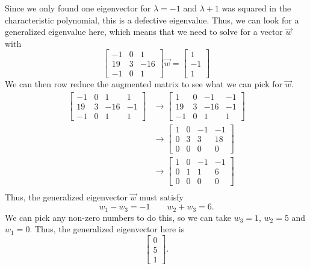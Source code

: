 \documentclass{ximera}
\begin{document}
\begin{exampleSol}
    Since we only found one eigenvector for $\lambda = -1$ and $\lambda + 1$ was squared in the characteristic polynomial, this is a defective eigenvalue. Thus, we can look for a generalized eigenvalue here, which means that we need to solve for a vector $\vec{w}$ with
    \[ 
        \begin{bmatrix} 
            -1 & 0 & 1 \\ 
            19 & 3 & -16 \\ 
            -1 & 0 & 1 
        \end{bmatrix} 
        \vec{w} = 
        \begin{bmatrix} 
            1 \\ 
            -1 \\ 
            1 
        \end{bmatrix}
    \]
    We can then row reduce the augmented matrix to see what we can pick for $\vec{w}$. 
    \[
        \begin{split}
            \begin{bmatrix} 
                -1 & 0 & 1 & 1 \\ 
                19 & 3 & -16 & -1\\ 
                -1 & 0 & 1 & 1 
            \end{bmatrix} 
            &\rightarrow 
            \begin{bmatrix} 
                1 & 0 & -1 & -1 \\ 
                19 & 3 & -16 & -1\\ 
                -1 & 0 & 1 & 1 
            \end{bmatrix} \\
            &\rightarrow 
            \begin{bmatrix} 
                1 & 0 & -1 & -1 \\ 
                0 & 3 & 3 & 18\\ 
                0 & 0 & 0 & 0 
            \end{bmatrix} \\
            &\rightarrow 
            \begin{bmatrix} 
                1 & 0 & -1 & -1 \\ 
                0 & 1 & 1 & 6\\ 
                0 & 0 & 0 & 0 
            \end{bmatrix} \\
        \end{split}
    \]
    Thus, the generalized eigenvector $\vec{w}$ must satisfy
    \[ 
        w_1 - w_3 = -1 \qquad w_2 + w_3 = 6. 
    \] 
    We can pick any non-zero numbers to do this, so we can take $w_3 = 1$, $w_2 = 5$ and $w_1 = 0$. Thus, the generalized eigenvector here is
    \[ 
        \begin{bmatrix} 
            0 \\ 
            5 \\ 
            1 
        \end{bmatrix}.
    \]
\end{exampleSol}
\end{document}
